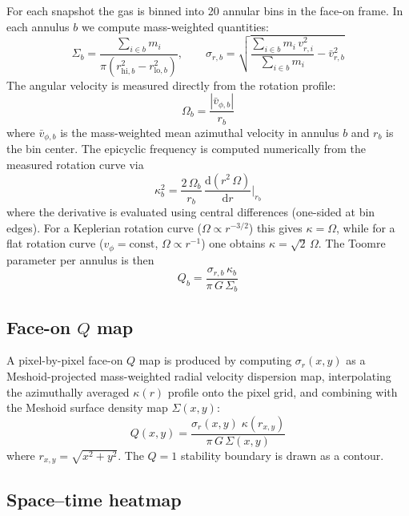 \documentclass[12pt]{article}
\begin{document}
For each snapshot the gas is binned into 20 annular bins in the face-on frame.
In each annulus $b$ we compute mass-weighted quantities:
\begin{equation}
    \Sigma_b = \frac{\sum_{i\in b} m_i}{\pi(r_{\mathrm{hi},b}^2 - r_{\mathrm{lo},b}^2)},
    \qquad
    \sigma_{r,b} = \sqrt{\frac{\sum_{i\in b} m_i\,v_{r,i}^2}{\sum_{i\in b} m_i} - \bar{v}_{r,b}^2}
\end{equation}
The angular velocity is measured directly from the rotation profile:
\begin{equation}
    \Omega_b = \frac{|\bar{v}_{\phi,b}|}{r_b}
\end{equation}
where $\bar{v}_{\phi,b}$ is the mass-weighted mean azimuthal velocity in annulus
$b$ and $r_b$ is the bin center. The epicyclic frequency is computed numerically
from the measured rotation curve via
\begin{equation}
    \kappa_b^2 = \frac{2\,\Omega_b}{r_b}\,\frac{\mathrm{d}(r^2\,\Omega)}{\mathrm{d}r}\bigg|_{r_b}
\end{equation}
where the derivative is evaluated using central differences (one-sided at bin
edges). For a Keplerian rotation curve ($\Omega \propto r^{-3/2}$) this gives
$\kappa = \Omega$, while for a flat rotation curve ($v_\phi = \mathrm{const}$,
$\Omega \propto r^{-1}$) one obtains $\kappa = \sqrt{2}\,\Omega$. The Toomre
parameter per annulus is then
\begin{equation}
    Q_b = \frac{\sigma_{r,b}\,\kappa_b}{\pi\,G\,\Sigma_b}
\end{equation}

\subsection*{Face-on $Q$ map}

A pixel-by-pixel face-on $Q$ map is produced by computing $\sigma_r(x,y)$ as a
Meshoid-projected mass-weighted radial velocity dispersion map, interpolating the
azimuthally averaged $\kappa(r)$ profile onto the pixel grid, and combining with
the Meshoid surface density map $\Sigma(x,y)$:
\begin{equation}
    Q(x,y) = \frac{\sigma_r(x,y)\;\kappa(r_{x,y})}{\pi\,G\,\Sigma(x,y)}
\end{equation}
where $r_{x,y} = \sqrt{x^2 + y^2}$.
The $Q=1$ stability boundary is drawn as a contour.

\subsection*{Space--time heatmap}
\end{document}
